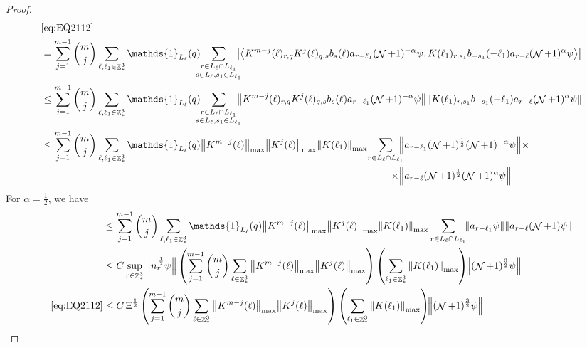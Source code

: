 \documentclass[sn-mathphys, Numbered ,a4paper]{sn-jnl}%
\DeclareMathOperator{\Z}{\mathbb{Z}}
\DeclareMathOperator{\NN}{\mathcal{N}}
\newcommand{\half}{\frac{1}{2}}
\newcommand{\eva}[1]{\left\langle #1 \right\rangle}
\theoremstyle{plain}
\theoremstyle{definition}
\theoremstyle{remark}
\theoremstyle{plain}
\theoremstyle{definition}
\theoremstyle{remark}
\begin{document}
\begin{proof}
\begin{alignat}{2}
  	&\eqref{eq:EQ2112}\nonumber\\
  	&= \sum\limits_{j=1}^{m-1} {{m}\choose j} \sum\limits_{\ell, \ell_1\in \Z^3_*} \mathds{1}_{L_{\ell}}(q)\!\!\!\! \sum\limits_{\substack{r\in L_{\ell} \cap L_{\ell_1}\\ s \in L_{\ell},s_1\in L_{\ell_1}}}\!\!\!\! \abs{ \eva{ K^{m-j}(\ell)_{r,q} K^{j}(\ell)_{q,s} b_{s}(\ell) a_{r-\ell_1}(\NN+1)^{-\alpha} \psi,  K(\ell_1)_{r,s_1} b_{-s_1}(-\ell_1) a_{r-\ell}(\NN+1)^{\alpha} \psi }}\nonumber\\
  	&\leq \sum\limits_{j=1}^{m-1} {{m}\choose j} \sum\limits_{\ell, \ell_1\in \Z^3_*} \mathds{1}_{L_{\ell}}(q)\!\!\!\! \sum\limits_{\substack{r\in L_{\ell} \cap L_{\ell_1}\\ s \in L_{\ell},s_1\in L_{\ell_1}}}\!\!\!\! \norm{ K^{m-j}(\ell)_{r,q} K^{j}(\ell)_{q,s} b_{s}(\ell) a_{r-\ell_1}(\NN+1)^{-\alpha} \psi}\norm{  K(\ell_1)_{r,s_1} b_{-s_1}(-\ell_1) a_{r-\ell}(\NN+1)^{\alpha} \psi }\nonumber\\
  	&\leq \sum\limits_{j=1}^{m-1} {{m}\choose j} \sum\limits_{\ell, \ell_1\in \Z^3_*} \mathds{1}_{L_{\ell}}(q) \norm{K^{m-j}(\ell)}_{\mathrm{max}} \norm{ K^{j}(\ell)}_{\mathrm{max}} \norm{ K(\ell_1) }_{\mathrm{max}} \begin{aligned}[t]\sum\limits_{r\in L_{\ell} \cap L_{\ell_1}}\!\!\! &\norm{ a_{r-\ell_1} (\NN+1)^{\frac{1}{2}} (\NN+1)^{-\alpha} \psi}\times \\ \times&\norm{a_{r-\ell} (\NN+1)^{\frac{1}{2}} (\NN+1)^{\alpha}\psi }	
   \end{aligned}\nonumber
  \end{alignat} 
  For $\alpha = \half$, we have
  \begin{align}
  	&\leq \sum\limits_{j=1}^{m-1} {{m}\choose j} \sum\limits_{\ell, \ell_1\in \Z^3_*} \mathds{1}_{L_{\ell}}(q) \norm{K^{m-j}(\ell)}_{\mathrm{max}} \norm{ K^{j}(\ell)}_{\mathrm{max}} \norm{ K(\ell_1) }_{\mathrm{max}} \sum\limits_{r\in L_{\ell} \cap L_{\ell_1}}\!\! \norm{ a_{r-\ell_1} \psi} \norm{ a_{r-\ell}(\NN+1) \psi }\nonumber\\
  	&\leq C \sup\limits_{r \in \Z^3_*} \norm{ n^{\,\half}_r \psi} \left(  \sum\limits_{j=1}^{m-1} {{m}\choose j} \sum\limits_{\ell \in \Z^3_*} \norm{K^{m-j}(\ell)}_{\mathrm{max}} \norm{ K^{j}(\ell)}_{\mathrm{max}} \right) \left( \sum\limits_{ \ell_1\in \Z^3_*} \norm{ K(\ell_1) }_{\mathrm{max} } \right)\!\! \norm{(\NN+1)^{\frac{3}{2}} \psi }\nonumber\\
  	\eqref{eq:EQ2112}&\leq C \, \Xi^\half \left(  \sum\limits_{j=1}^{m-1} {{m}\choose j} \sum\limits_{\ell \in \Z^3_*} \norm{K^{m-j}(\ell)}_{\mathrm{max}} \norm{ K^{j}(\ell)}_{\mathrm{max}}\right) \left( \sum\limits_{ \ell_1\in \Z^3_*}\norm{ K(\ell_1) }_{\mathrm{max}} \right)\!\! \norm{(\NN+1)^{\frac{3}{2}} \psi }\label{eq:estEQ2112}		

\end{align}
\end{proof}
\end{document}
